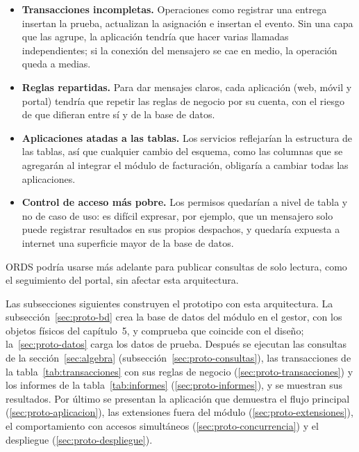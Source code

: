 \begin{itemize}[itemsep=2pt]
  \item \textbf{Transacciones incompletas.} Operaciones como registrar
        una entrega insertan la prueba, actualizan la asignación e
        insertan el evento. Sin una capa que las agrupe, la aplicación
        tendría que hacer varias llamadas independientes; si la conexión
        del mensajero se cae en medio, la operación queda a medias.
  \item \textbf{Reglas repartidas.} Para dar mensajes claros, cada
        aplicación (web, móvil y portal) tendría que repetir las reglas
        de negocio por su cuenta, con el riesgo de que difieran entre sí
        y de la base de datos.
  \item \textbf{Aplicaciones atadas a las tablas.} Los servicios
        reflejarían la estructura de las tablas, así que cualquier cambio
        del esquema, como las columnas que se agregarán al integrar el
        módulo de facturación, obligaría a cambiar todas las
        aplicaciones.
  \item \textbf{Control de acceso más pobre.} Los permisos quedarían a
        nivel de tabla y no de caso de uso: es difícil expresar, por
        ejemplo, que un mensajero solo puede registrar resultados en sus
        propios despachos, y quedaría expuesta a internet una superficie
        mayor de la base de datos.
\end{itemize}

ORDS podría usarse más adelante para publicar consultas de solo lectura,
como el seguimiento del portal, sin afectar esta arquitectura.

Las subsecciones siguientes construyen el prototipo con esta
arquitectura. La subsección~\ref{sec:proto-bd} crea la base de datos del
módulo en el gestor, con los objetos físicos del capítulo~5, y comprueba
que coincide con el diseño; la~\ref{sec:proto-datos} carga los datos de
prueba. Después se ejecutan las consultas de la
sección~\ref{sec:algebra} (subsección~\ref{sec:proto-consultas}), las
transacciones de la tabla~\ref{tab:transacciones} con sus reglas de
negocio (\ref{sec:proto-transacciones}) y los informes de la
tabla~\ref{tab:informes} (\ref{sec:proto-informes}), y se muestran sus
resultados. Por último se presentan la aplicación que demuestra el flujo
principal (\ref{sec:proto-aplicacion}), las extensiones fuera del módulo
(\ref{sec:proto-extensiones}), el comportamiento con accesos
simultáneos (\ref{sec:proto-concurrencia}) y el despliegue
(\ref{sec:proto-despliegue}).

